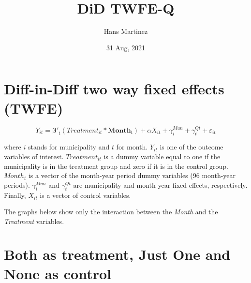 \documentclass[
]{article}
\title{DiD TWFE-Q}
\author{Hans Martinez}
\date{31 Aug, 2021}
\begin{document}
\maketitle

\hypertarget{diff-in-diff-two-way-fixed-effects-twfe}{%
\section{Diff-in-Diff two way fixed effects
(TWFE)}\label{diff-in-diff-two-way-fixed-effects-twfe}}

\begin{equation}
  Y_{it}=\bm{\beta'}_{t}(Treatment_{it}*\bm{Month}_{t}) + \alpha X_{it} + \gamma^{Mun}_{i} + \gamma^{Qt}_{t}  + \varepsilon_{it}
\end{equation}

where \(i\) stands for municipality and \(t\) for month. \(Y_{it}\) is
one of the outcome variables of interest. \(Treatment_{it}\) is a dummy
variable equal to one if the municipality is in the treatment group and
zero if it is in the control group. \(Month_{t}\) is a vector of the
month-year period dummy variables (96 month-year periods).
\(\gamma^{Mun}_{i}\) and \(\gamma^{Qt}_{t}\) are municipality and
month-year fixed effects, respectively. Finally, \(X_{it}\) is a vector
of control variables.

The graphs below show only the interaction between the \emph{Month} and
the \emph{Treatment} variables.

\hypertarget{both-as-treatment-just-one-and-none-as-control}{%
\section{Both as treatment, Just One and None as
control}\label{both-as-treatment-just-one-and-none-as-control}}
\end{document}
